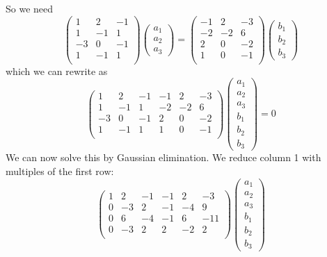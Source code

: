 \documentclass{article}
\newcommand{\chapternumber}{2}
\newenvironment{QandA}{\begin{enumerate}[label=\chapternumber.\arabic*]\bfseries\boldmath}
	{\end{enumerate}}
\newenvironment{answered}{\par\bigskip\normalfont\unboldmath}{}
\begin{document}
\begin{QandA}
\begin{answered}
			So we need
			\[
			\begin{pmatrix}
				1 &  2 & -1 \\
				1 & -1 &  1 \\
				-3 &  0 & -1 \\
				1 & -1 &  1 \\
			\end{pmatrix}
			\begin{pmatrix}
				a_1 \\ a_2 \\ a_3
			\end{pmatrix}
			=	
			\begin{pmatrix}
				-1 &  2 & -3 \\
				-2 & -2 &  6 \\
				2 &  0 & -2 \\
				1 &  0 & -1 \\
			\end{pmatrix}
			\begin{pmatrix}
				b_1 \\ b_2 \\ b_3
			\end{pmatrix}
			\]
			which we can rewrite as
			\[
			\begin{pmatrix}
				1 &  2 & -1 & -1 &  2 & -3  \\
				1 & -1 &  1  & -2 & -2 &  6\\
				-3 &  0 & -1 & 2 &  0 & -2 \\
				1 & -1 &  1  & 1 &  0 & -1\\
			\end{pmatrix}
			\begin{pmatrix}
				a_1 \\ a_2 \\ a_3 \\ b_1 \\ b_2 \\ b_3
			\end{pmatrix}
			= 0
			\]
			We can now solve this by Gaussian elimination. We reduce column 1 with multiples of the first row:
			\[
			\begin{pmatrix}
				1 &  2 & -1 & -1 &  2 & -3  \\
				0 & -3 &  2  & -1 & -4 &  9\\
				0 &  6 & -4 & -1 &  6 & -11 \\
				0 & -3 &  2  & 2 &  -2 & 2\\
			\end{pmatrix}
			\begin{pmatrix}
				a_1 \\ a_2 \\ a_3 \\ b_1 \\ b_2 \\ b_3

\end{pmatrix}\]
\end{answered}
\end{QandA}
\end{document}
